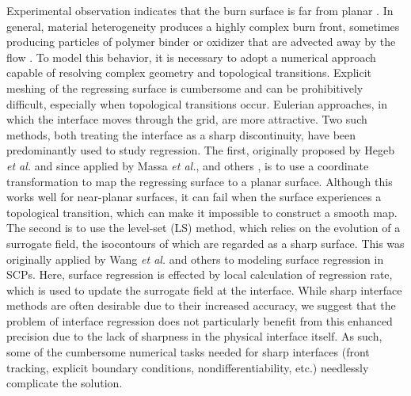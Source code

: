 \documentclass[colorinlistoftodos,review]{elsarticle}
\begin{document}
Experimental observation indicates that the burn surface is far from planar \cite{wang2019operando}.
In general, material heterogeneity produces a highly complex burn front, sometimes producing particles of polymer binder or oxidizer that are advected away by the flow \cite{babuk2000formation}.
To model this behavior, it is necessary to adopt a numerical approach capable of resolving complex geometry and topological transitions.
Explicit meshing of the regressing surface is cumbersome and can be prohibitively difficult, especially when topological transitions occur.
Eulerian approaches, in which the interface moves through the grid, are more attractive.
Two such methods, both treating the interface as a sharp discontinuity, have been predominantly used to study regression.
The first, originally proposed by Hegeb {\it et al.} \cite{hegab2001nonsteady} and since applied by Massa {\it et al.}, \cite{massa2003numerical} and others \cite{kumar2021three}, is to use a coordinate transformation to map the regressing surface to a planar surface.
Although this works well for near-planar surfaces, it can fail when the surface experiences a topological transition, which can make it impossible to construct a smooth map.
The second is to use the level-set (LS) method, which relies on the evolution of a surrogate field, the isocontours of which are regarded as a sharp surface.
This was originally applied by Wang {\it et al.} \cite{wang2004numerical} and others \cite{ye2019numerical,kumar2020eulerian} to modeling surface regression in SCPs.
Here, surface regression is effected by local calculation of regression rate, which is used to update the surrogate field at the interface.
While sharp interface methods are often desirable due to their increased accuracy, we suggest that the problem of interface regression does not particularly benefit from this enhanced precision due to the lack of sharpness in the physical interface itself.
As such, some of the cumbersome numerical tasks needed for sharp interfaces (front tracking, explicit boundary conditions, nondifferentiability, etc.) needlessly complicate the solution.
\end{document}
